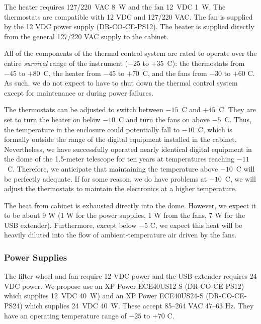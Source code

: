 \documentclass{article}
\begin{document}
The heater requires 127/220~VAC 8~W and the fan 12~VDC 1~W. The thermostats are compatible with 12 VDC and 127/220 VAC. The fan is supplied by the 12 VDC power supply (DR-CO-CE-PS12). The heater is supplied directly from the general 127/220 VAC supply to the cabinet.

All of the components of the thermal control system are rated to operate over the entire \emph{survival} range of the instrument ($-25$ to $+35$~C): the thermostats from $-45$ to $+80$~C, the heater from $-45$ to $+70$~C, and the fans from $-30$ to $+60$ C. As such, we do not expect to have to shut down the thermal control system except for maintenance or during power failures.


The thermostats can be adjusted to switch between $-15$~C and $+45$~C. They are set to turn the heater on below $-10$~C and turn the fans on above $-5$~C. Thus, the temperature in the enclosure could potentially fall to $-10$~C, which is formally outside the range of the digital equipment installed in the cabinet. Nevertheless, we have successfully operated nearly identical digital equipment in the dome of the 1.5-meter telescope for ten years at temperatures reaching $-11$~C. Therefore, we anticipate that maintaining the temperature above $-10$~C will be perfectly adequate. If for some reason, we do have problems at $-10$~C, we will adjust the thermostats to maintain the electronics at a higher temperature.

The heat from cabinet is exhausted directly into the dome. However, we expect it to be about 9 W (1 W for the power supplies, 1 W from the fans, 7 W for the USB extender). Furthermore, except below $-5$ C, we expect this heat will be heavily diluted into the flow of ambient-temperature air driven by the fans.

\subsubsection{Power Supplies}

The filter wheel and fan require 12 VDC power and the USB extender requires 24 VDC power. We propose use an XP Power ECE40US12-S (DR-CO-CE-PS12) which supplies 12~VDC 40~W) and an XP Power ECE40US24-S (DR-CO-CE-PS24) which supplies 24~VDC 40~W. These accept 85--264 VAC 47--63 Hz. They have an operating temperature range of $-25$ to $+70$ C.
\end{document}
